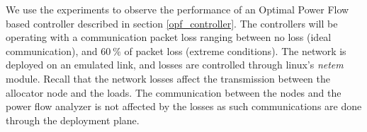\documentclass[conference]{IEEEtran}
\begin{document}
We use the experiments to observe the performance of an Optimal Power Flow based controller described in section \ref{opf_controller}. The controllers will be operating with a communication packet loss ranging between no loss (ideal communication), and $60~\%$ of packet loss (extreme conditions). The network is deployed on an emulated link, and losses are controlled through linux's \emph{netem} module. Recall that the network losses affect the transmission between the allocator node and the loads. The communication between the nodes and the power flow analyzer is not affected by the losses as such communications are done through the deployment plane.




\end{document}
